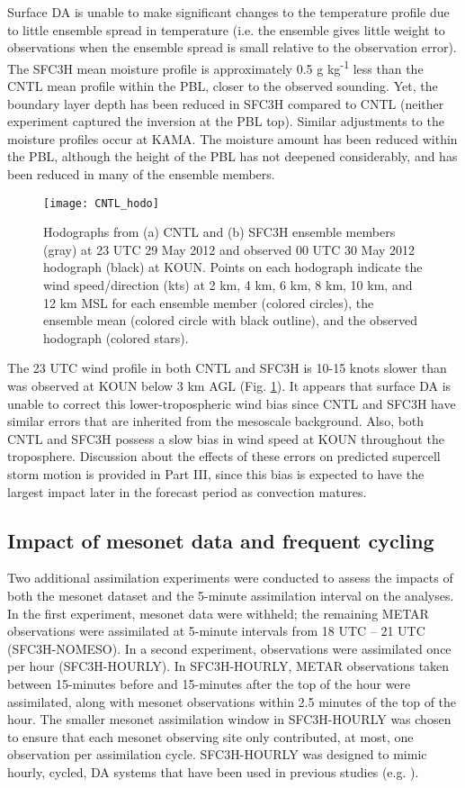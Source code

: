 Surface DA is unable to make significant changes to the temperature profile due to little ensemble spread in temperature (i.e. the ensemble gives little weight to observations when the ensemble spread is small relative to the observation error). The SFC3H mean moisture profile is approximately 0.5 g kg\textsuperscript{-1} less than the CNTL mean profile within the PBL, closer to the observed sounding. Yet, the boundary layer depth has been reduced in SFC3H compared to CNTL (neither experiment captured the inversion at the PBL top). Similar adjustments to the moisture profiles occur at KAMA. The moisture amount has been reduced within the PBL, although the height of the PBL has not deepened considerably, and has been reduced in many of the ensemble members.
\begin{figure}
\centering
\texttt{[image: CNTL\_hodo]}
\caption{Hodographs from (a) CNTL and (b) SFC3H ensemble members (gray) at 23 UTC 29 May 2012 and observed 00 UTC 30 May 2012 hodograph (black) at KOUN. Points on each hodograph indicate the wind speed/direction (kts) at 2 km, 4 km, 6 km, 8 km, 10 km, and 12 km MSL for each ensemble member (colored circles), the ensemble mean (colored circle with black outline), and the observed hodograph (colored stars).}
\label{hodo}
\end{figure}

The 23 UTC wind profile in both CNTL and SFC3H is 10-15 knots slower than was observed at KOUN below 3 km AGL (Fig. \ref{hodo}). It appears that surface DA is unable to correct this lower-tropospheric wind bias since CNTL and SFC3H have similar errors that are inherited from the mesoscale background. Also, both CNTL and SFC3H possess a slow bias in wind speed at KOUN throughout the troposphere. Discussion about the effects of these errors on predicted supercell storm motion is provided in Part III, since this bias is expected to have the largest impact later in the forecast period as convection matures.

\subsection{Impact of mesonet data and frequent cycling}
Two additional assimilation experiments were conducted to assess the impacts of both the mesonet dataset and the 5-minute assimilation interval on the analyses. In the first experiment, mesonet data were withheld; the remaining METAR observations were assimilated at 5-minute intervals from 18 UTC -- 21 UTC (SFC3H-NOMESO). In a second experiment, observations were assimilated once per hour (SFC3H-HOURLY). In SFC3H-HOURLY, METAR observations taken between 15-minutes before and 15-minutes after the top of the hour were assimilated, along with mesonet observations within 2.5 minutes of the top of the hour. The smaller mesonet assimilation window in SFC3H-HOURLY was chosen to ensure that each mesonet observing site only contributed, at most, one observation per assimilation cycle. SFC3H-HOURLY was designed to mimic hourly, cycled, DA systems that have been used in previous studies (e.g. \citealt{wheatleyetal12}).

